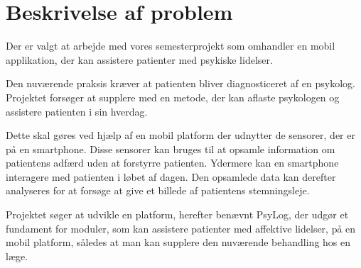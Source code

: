\section{Beskrivelse af problem}
Der er valgt at arbejde med vores semesterprojekt som omhandler en mobil applikation, der kan assistere patienter med psykiske lidelser.

Den nuværende praksis kræver at patienten bliver diagnosticeret af en psykolog.
Projektet forsøger at supplere med en metode, der kan aflaste psykologen og assistere patienten i sin hverdag.

Dette skal gøres ved hjælp af en mobil platform der udnytter de sensorer, der er på en smartphone.
Disse sensorer kan bruges til at opsamle information om patientens adfærd uden at forstyrre patienten.
Ydermere kan en smartphone interagere med patienten i løbet af dagen. 
Den opsamlede data kan derefter analyseres for at forsøge at give et billede af patientens stemningsleje.

Projektet søger at udvikle en platform, herefter benævnt PsyLog, der udgør et fundament for moduler, som kan assistere patienter med affektive lidelser, på en mobil platform, således at man kan supplere den nuværende behandling hos en læge.